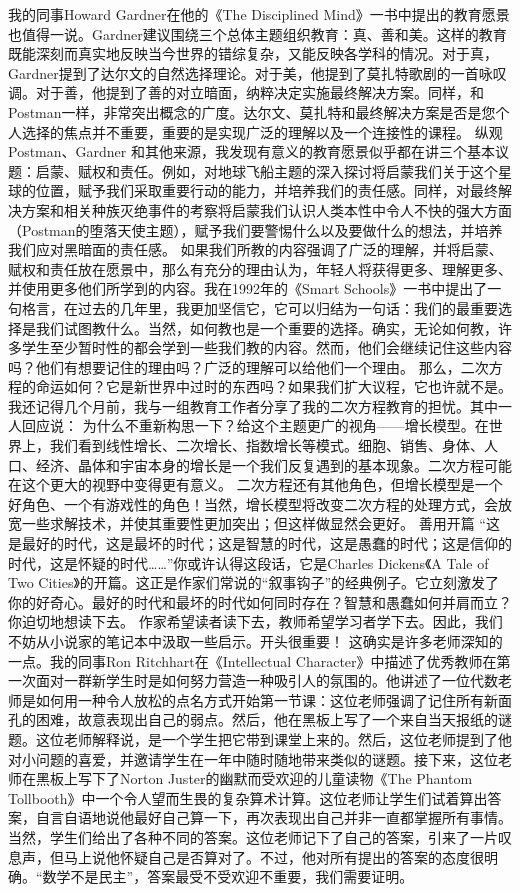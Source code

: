 我的同事Howard Gardner在他的《The Disciplined Mind》一书中提出的教育愿景也值得一说。Gardner建议围绕三个总体主题组织教育：真、善和美。这样的教育既能深刻而真实地反映当今世界的错综复杂，又能反映各学科的情况。对于真，Gardner提到了达尔文的自然选择理论。对于美，他提到了莫扎特歌剧的一首咏叹调。对于善，他提到了善的对立暗面，纳粹决定实施最终解决方案。同样，和Postman一样，非常突出概念的广度。达尔文、莫扎特和最终解决方案是否是您个人选择的焦点并不重要，重要的是实现广泛的理解以及一个连接性的课程。
纵观 Postman、Gardner 和其他来源，我发现有意义的教育愿景似乎都在讲三个基本议题：启蒙、赋权和责任。例如，对地球飞船主题的深入探讨将启蒙我们关于这个星球的位置，赋予我们采取重要行动的能力，并培养我们的责任感。同样，对最终解决方案和相关种族灭绝事件的考察将启蒙我们认识人类本性中令人不快的强大方面（Postman的堕落天使主题），赋予我们要警惕什么以及要做什么的想法，并培养我们应对黑暗面的责任感。
如果我们所教的内容强调了广泛的理解，并将启蒙、赋权和责任放在愿景中，那么有充分的理由认为，年轻人将获得更多、理解更多、并使用更多他们所学到的内容。我在1992年的《Smart Schools》一书中提出了一句格言，在过去的几年里，我更加坚信它，它可以归结为一句话：我们的最重要选择是我们试图教什么。当然，如何教也是一个重要的选择。确实，无论如何教，许多学生至少暂时性的都会学到一些我们教的内容。然而，他们会继续记住这些内容吗？他们有想要记住的理由吗？广泛的理解可以给他们一个理由。
那么，二次方程的命运如何？它是新世界中过时的东西吗？如果我们扩大议程，它也许就不是。我还记得几个月前，我与一组教育工作者分享了我的二次方程教育的担忧。其中一人回应说：
为什么不重新构思一下？给这个主题更广的视角——增长模型。在世界上，我们看到线性增长、二次增长、指数增长等模式。细胞、销售、身体、人口、经济、晶体和宇宙本身的增长是一个我们反复遇到的基本现象。二次方程可能在这个更大的视野中变得更有意义。
二次方程还有其他角色，但增长模型是一个好角色、一个有游戏性的角色！当然，增长模型将改变二次方程的处理方式，会放宽一些求解技术，并使其重要性更加突出；但这样做显然会更好。
善用开篇
“这是最好的时代，这是最坏的时代；这是智慧的时代，这是愚蠢的时代；这是信仰的时代，这是怀疑的时代……”你或许认得这段话，它是Charles Dickens《A Tale of Two Cities》的开篇。这正是作家们常说的“叙事钩子”的经典例子。它立刻激发了你的好奇心。最好的时代和最坏的时代如何同时存在？智慧和愚蠢如何并肩而立？你迫切地想读下去。
作家希望读者读下去，教师希望学习者学下去。因此，我们不妨从小说家的笔记本中汲取一些启示。开头很重要！
这确实是许多老师深知的一点。我的同事Ron Ritchhart在《Intellectual Character》中描述了优秀教师在第一次面对一群新学生时是如何努力营造一种吸引人的氛围的。他讲述了一位代数老师是如何用一种令人放松的点名方式开始第一节课：这位老师强调了记住所有新面孔的困难，故意表现出自己的弱点。然后，他在黑板上写了一个来自当天报纸的谜题。这位老师解释说，是一个学生把它带到课堂上来的。然后，这位老师提到了他对小问题的喜爱，并邀请学生在一年中随时随地带来类似的谜题。接下来，这位老师在黑板上写下了Norton Juster的幽默而受欢迎的儿童读物《The Phantom Tollbooth》中一个令人望而生畏的复杂算术计算。这位老师让学生们试着算出答案，自言自语地说他最好自己算一下，再次表现出自己并非一直都掌握所有事情。当然，学生们给出了各种不同的答案。这位老师记下了自己的答案，引来了一片叹息声，但马上说他怀疑自己是否算对了。不过，他对所有提出的答案的态度很明确。“数学不是民主”，答案最受不受欢迎不重要，我们需要证明。
